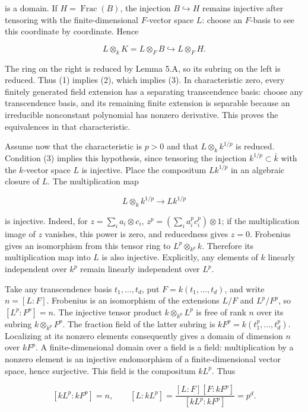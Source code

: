 \documentclass[
]{article}
\begin{document}
is a domain. If \(H=\operatorname{Frac}(B)\), the injection
\(B\hookrightarrow H\) remains injective after tensoring with the
finite-dimensional \(F\)-vector space \(L\): choose an \(F\)-basis to
see this coordinate by coordinate. Hence

\[
L\otimes_k K=L\otimes_F B\hookrightarrow L\otimes_F H.
\]

The ring on the right is reduced by Lemma 5.A, so its subring on the
left is reduced. Thus (1) implies (2), which implies (3). In
characteristic zero, every finitely generated field extension has a
separating transcendence basis: choose any transcendence basis, and its
remaining finite extension is separable because an irreducible
nonconstant polynomial has nonzero derivative. This proves the
equivalences in that characteristic.

Assume now that the characteristic is \(p>0\) and that
\(L\otimes_k k^{1/p}\) is reduced. Condition (3) implies this
hypothesis, since tensoring the injection \(k^{1/p}\subset\bar k\) with
the \(k\)-vector space \(L\) is injective. Place the compositum
\(Lk^{1/p}\) in an algebraic closure of \(L\). The multiplication map

\[
L\otimes_k k^{1/p}\longrightarrow Lk^{1/p}
\]

is injective. Indeed, for \(z=\sum_i a_i\otimes c_i\),
\(z^p=(\sum_i a_i^pc_i^p)\otimes1\); if the multiplication image of
\(z\) vanishes, this power is zero, and reducedness gives \(z=0\).
Frobenius gives an isomorphism from this tensor ring to
\(L^p\otimes_{k^p}k\). Therefore its multiplication map into \(L\) is
also injective. Explicitly, any elements of \(k\) linearly independent
over \(k^p\) remain linearly independent over \(L^p\).

Take any transcendence basis \(t_1,\ldots,t_d\), put
\(F=k(t_1,\ldots,t_d)\), and write \(n=[L:F]\). Frobenius is an
isomorphism of the extensions \(L/F\) and \(L^p/F^p\), so
\([L^p:F^p]=n\). The injective tensor product \(k\otimes_{k^p}L^p\) is
free of rank \(n\) over its subring \(k\otimes_{k^p}F^p\). The fraction
field of the latter subring is \(kF^p=k(t_1^p,\ldots,t_d^p)\).
Localizing at its nonzero elements consequently gives a domain of
dimension \(n\) over \(kF^p\). A finite-dimensional domain over a field
is a field: multiplication by a nonzero element is an injective
endomorphism of a finite-dimensional vector space, hence surjective.
This field is the compositum \(kL^p\). Thus

\[
[kL^p:kF^p]=n,\qquad
[L:kL^p]=\frac{[L:F][F:kF^p]}{[kL^p:kF^p]}=p^d.
\tag{5.1}
\]
\end{document}
